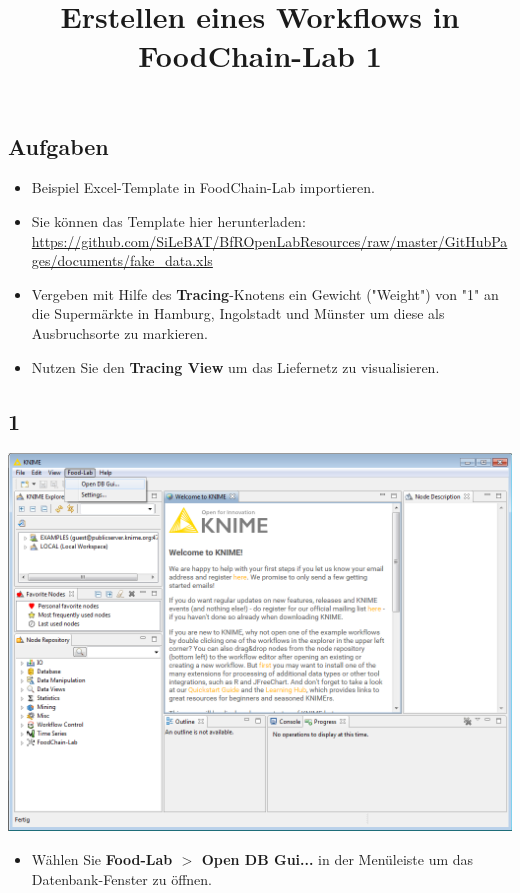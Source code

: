 \documentclass{beamer}
\title{Erstellen eines Workflows in FoodChain-Lab 1}
\date{}
\begin{document}
\maketitle

\section{ }

\subsection{Aufgaben}
\begin{frame}
	\begin{itemize}
		\item Beispiel Excel-Template in FoodChain-Lab importieren.
		\item Sie können das Template hier herunterladen: \url{https://github.com/SiLeBAT/BfROpenLabResources/raw/master/GitHubPages/documents/fake_data.xls}
		\item Vergeben mit Hilfe des \textbf{Tracing}-Knotens ein Gewicht ("Weight") von "1" an die Supermärkte in Hamburg, Ingolstadt und Münster um diese als Ausbruchsorte zu markieren.
		\item Nutzen Sie den \textbf{Tracing View} um das Liefernetz zu visualisieren.
	\end{itemize}
\end{frame}
 
\subsection{1}
\begin{frame}
	\begin{center}
  		\includegraphics[height=0.6\textheight]{1.png}
	\end{center}
	\begin{itemize}
		\item Wählen Sie \textbf{Food-Lab $>$ Open DB Gui...} in der Menüleiste um das Datenbank-Fenster zu öffnen.
	\end{itemize}
\end{frame}
\end{document}
